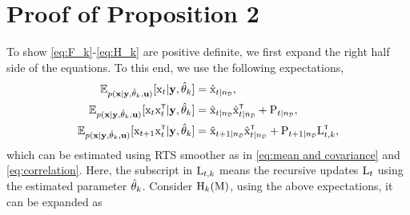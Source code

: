 \section{Proof of Proposition 2}\label{app:proof PD of Expectation}
To show \eqref{eq:F_k}-\eqref{eq:H_k} are positive definite, we first expand the right half side of the equations. To this end, we use the following expectations,
\begin{align}
\mathbb{E}_{p(\mathbf{x}|\mathbf{y},\hat{\vctheta}_k,\mathbf{u})}[\vcx_t|\mathbf{y}, \hat{\vctheta}_k] &= \hat{\vcx}_{t|\nD}, \label{eq:expectation 1}\\
\mathbb{E}_{p(\mathbf{x}|\mathbf{y},\hat{\vctheta}_k,\mathbf{u})}[\vcx_t \vcx_t^\tr|\mathbf{y}, \hat{\vctheta}_k] &= \hat{\vcx}_{t|\nD}\hat{\vcx}_{t|\nD}^\tr + \mxP_{t|\nD}, \label{eq:expectation 2} \\
\mathbb{E}_{p(\mathbf{x}|\mathbf{y},\hat{\vctheta}_k,\mathbf{u})}[\vcx_{t+1} \vcx_t^\tr|\mathbf{y}, \hat{\vctheta}_k] &= \hat{\vcx}_{t+1|{\nD}}\hat{\vcx}_{t|{\nD}}^\tr + \mxP_{t+1|{\nD}}\mxL_{t,k}^\tr, \label{eq:expectation 3}
\end{align}
which can be estimated using RTS smoother as in \eqref{eq:mean and covariance} and \eqref{eq:correlation}.
Here, the subscript in ${ \mathrm{L} }_{t,k}$ means the recursive updates ${ \mathrm{L} }_t$ using the estimated parameter $\hat{{ \mathrm{\theta} }}_k$. Consider ${ \mathrm{H} }_k({ \mathrm{M} })$, using the above expectations, it can be expanded as
